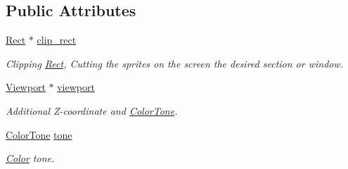 \subsection*{Public Attributes}
\begin{DoxyCompactItemize}
\item 
\hypertarget{class_f2_c_1_1_sprite_aa03b4a6e204fb24f935d42bf0d40b1bd}{
\hyperlink{class_f2_c_1_1_rect}{Rect} $\ast$ \hyperlink{class_f2_c_1_1_sprite_aa03b4a6e204fb24f935d42bf0d40b1bd}{clip\_\-rect}}
\label{class_f2_c_1_1_sprite_aa03b4a6e204fb24f935d42bf0d40b1bd}

\begin{DoxyCompactList}\small\item\em Clipping \hyperlink{class_f2_c_1_1_rect}{Rect}, Cutting the sprites on the screen the desired section or window. \item\end{DoxyCompactList}\item 
\hypertarget{class_f2_c_1_1_sprite_a66cc8d6922dcbf4331b360800ba47177}{
\hyperlink{class_f2_c_1_1_viewport}{Viewport} $\ast$ \hyperlink{class_f2_c_1_1_sprite_a66cc8d6922dcbf4331b360800ba47177}{viewport}}
\label{class_f2_c_1_1_sprite_a66cc8d6922dcbf4331b360800ba47177}

\begin{DoxyCompactList}\small\item\em Additional Z-\/coordinate and \hyperlink{class_f2_c_1_1_color_tone}{ColorTone}. \item\end{DoxyCompactList}\item 
\hypertarget{class_f2_c_1_1_sprite_aa1b34c2ac3927922793a729b63046b06}{
\hyperlink{class_f2_c_1_1_color_tone}{ColorTone} \hyperlink{class_f2_c_1_1_sprite_aa1b34c2ac3927922793a729b63046b06}{tone}}
\label{class_f2_c_1_1_sprite_aa1b34c2ac3927922793a729b63046b06}

\begin{DoxyCompactList}\small\item\em \hyperlink{class_f2_c_1_1_color}{Color} tone. \item\end{DoxyCompactList}\end{DoxyCompactItemize}
